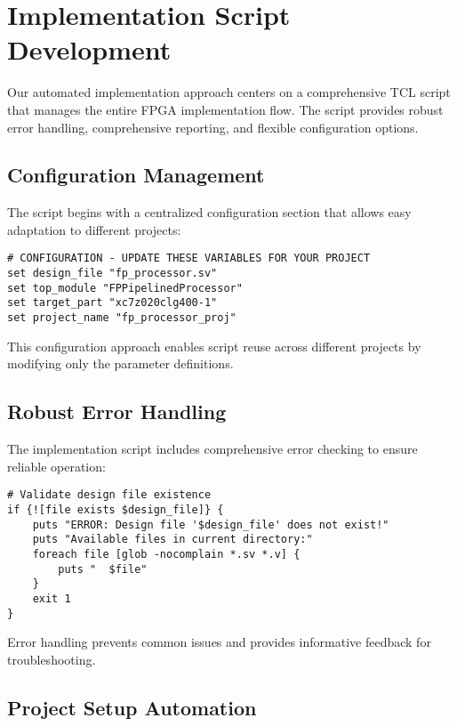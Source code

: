 \section{Implementation Script Development}
\label{sec:script_development}

Our automated implementation approach centers on a comprehensive TCL script that manages the entire FPGA implementation flow. The script provides robust error handling, comprehensive reporting, and flexible configuration options.

\subsection{Configuration Management}

The script begins with a centralized configuration section that allows easy adaptation to different projects:

\begin{lstlisting}[caption=Project Configuration]
# CONFIGURATION - UPDATE THESE VARIABLES FOR YOUR PROJECT
set design_file "fp_processor.sv"
set top_module "FPPipelinedProcessor"
set target_part "xc7z020clg400-1"
set project_name "fp_processor_proj"
\end{lstlisting}

This configuration approach enables script reuse across different projects by modifying only the parameter definitions.

\subsection{Robust Error Handling}

The implementation script includes comprehensive error checking to ensure reliable operation:

\begin{lstlisting}[caption=Input Validation]
# Validate design file existence
if {![file exists $design_file]} {
    puts "ERROR: Design file '$design_file' does not exist!"
    puts "Available files in current directory:"
    foreach file [glob -nocomplain *.sv *.v] {
        puts "  $file"
    }
    exit 1
}
\end{lstlisting}

Error handling prevents common issues and provides informative feedback for troubleshooting.

\subsection{Project Setup Automation}

